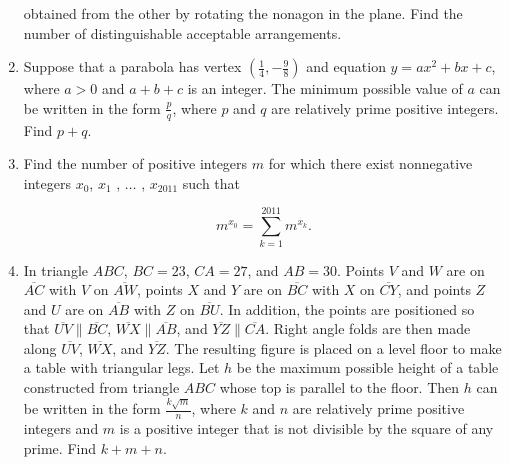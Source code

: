 \documentclass{article}
\begin{document}
\begin{enumerate}[label=\arabic*., itemsep=0.5em]
obtained from the other by rotating the nonagon in the plane.  Find the number of distinguishable acceptable arrangements.\par \vspace{0.5em}\item Suppose that a parabola has vertex \(\left(\frac{1}{4},-\frac{9}{8}\right)\) and equation \(y = ax^2 + bx + c\), where \(a > 0\) and \(a + b + c\) is an integer.  The minimum possible value of \(a\) can be written in the form \(\frac{p}{q}\), where \(p\) and \(q\) are relatively prime positive integers.  Find \(p + q\).\par \vspace{0.5em}\item Find the number of positive integers \(m\) for which there exist nonnegative integers \(x_0\), \(x_1\) , \(\dots\) , \(x_{2011}\) such that

\begin{equation*}
m^{x_0} = \sum_{k = 1}^{2011} m^{x_k}.
\end{equation*}
\par \vspace{0.5em}\item In triangle \(ABC\), \(BC = 23\), \(CA = 27\), and \(AB = 30\).  Points \(V\) and \(W\) are on \(\overline{AC}\) with \(V\) on \(\overline{AW}\), points \(X\) and \(Y\) are on \(\overline{BC}\) with \(X\) on \(\overline{CY}\), and points \(Z\) and \(U\) are on \(\overline{AB}\) with \(Z\) on \(\overline{BU}\).  In addition, the points are positioned so that \(\overline{UV} \parallel \overline{BC}\), \(\overline{WX} \parallel \overline{AB}\), and \(\overline{YZ} \parallel \overline{CA}\).  Right angle folds are then made along \(\overline{UV}\), \(\overline{WX}\), and \(\overline{YZ}\).  The resulting figure is placed on a level floor to make a table with triangular legs.  Let \(h\) be the maximum possible height of a table constructed from triangle \(ABC\) whose top is parallel to the floor.  Then \(h\) can be written in the form \(\frac{k \sqrt{m}}{n}\), where \(k\) and \(n\) are relatively prime positive integers and \(m\) is a positive integer that is not divisible by the square of any prime.  Find \(k + m + n\).


\end{enumerate}
\end{document}
